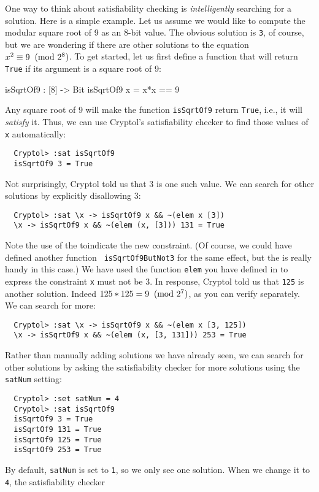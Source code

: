 One way to think about satisfiability checking is \emph{intelligently}
searching for a solution. Here is a simple example. Let us assume we
would like to compute the modular square root of 9 as an 8-bit
value. The obvious solution is {\tt 3}, of course, but we are
wondering if there are other solutions to the equation $x^2 \equiv 9
\imod{2^8}$. To get started, let us first define a function that will
return {\tt True} if its argument is a square root of 9:
\begin{code}
  isSqrtOf9 : [8] -> Bit
  isSqrtOf9 x = x*x == 9
\end{code}
Any square root of 9 will make the function {\tt isSqrtOf9} return
{\tt True}, i.e., it will \emph{satisfy} it.  Thus, we can use
Cryptol's satisfiability checker to find those values of {\tt x}
automatically:
\begin{Verbatim}
  Cryptol> :sat isSqrtOf9 
  isSqrtOf9 3 = True
\end{Verbatim}
Not surprisingly, Cryptol told us that 3 is one such value. We can
search for other solutions by explicitly disallowing 3:
\begin{Verbatim}
  Cryptol> :sat \x -> isSqrtOf9 x && ~(elem x [3])
  \x -> isSqrtOf9 x && ~(elem (x, [3])) 131 = True
\end{Verbatim}
Note the use of the \lamex to\indLamExp indicate the new
constraint. (Of course, we could have defined another function {\tt
  isSqrtOf9ButNot3} for the same effect, but the \lamex is really
handy in this case.) We have used the function {\tt elem} you have
defined in \indElem to
express the constraint {\tt x} must not be 3. In response, Cryptol
told us that {\tt 125} is another solution. Indeed $125 * 125 =
9\imod{2^7}$, as you can verify separately.  We can search for more:
\begin{Verbatim}
  Cryptol> :sat \x -> isSqrtOf9 x && ~(elem x [3, 125])
  \x -> isSqrtOf9 x && ~(elem (x, [3, 131])) 253 = True
\end{Verbatim}
Rather than manually adding solutions we have already seen, we can
search for other solutions by asking the satisfiability checker for
more solutions using the {\tt satNum} setting:
\begin{Verbatim}
  Cryptol> :set satNum = 4
  Cryptol> :sat isSqrtOf9
  isSqrtOf9 3 = True
  isSqrtOf9 131 = True
  isSqrtOf9 125 = True
  isSqrtOf9 253 = True
\end{Verbatim}
By default, {\tt satNum} is set to {\tt 1}, so we only see one
solution. When we change it to {\tt 4}, the satisfiability checker
